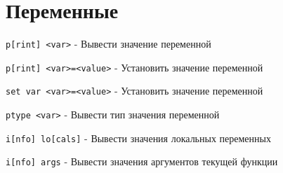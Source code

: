 \section{Переменные}

\noindent \texttt{p[rint] <var>} - Вывести значение переменной

\noindent \texttt{p[rint] <var>=<value>} - Установить значение переменной

\noindent \texttt{set var <var>=<value>} - Установить значение переменной

\noindent \texttt{ptype <var>} - Вывести тип значения переменной

\noindent \texttt{i[nfo] lo[cals]} - Вывести значения локальных переменных

\noindent \texttt{i[nfo] args} - Вывести значения аргументов текущей функции
